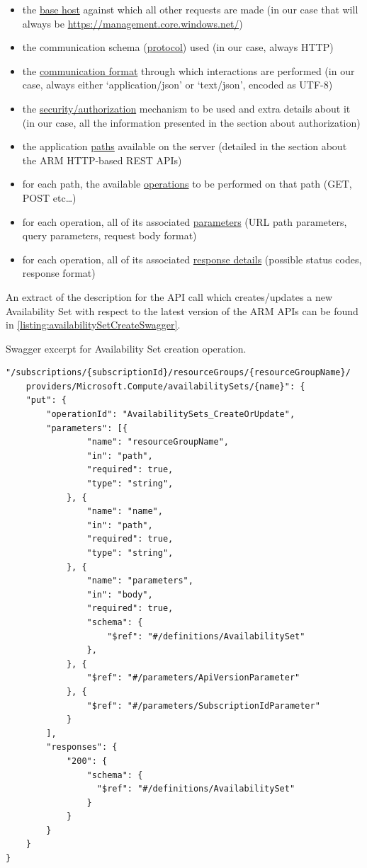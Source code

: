 \documentclass[11pt]{report}
\begin{document}
\begin{itemize}
    \item{} the \ul{base host} against which all other requests are made (in our
        case that will always be \url{https://management.core.windows.net/})
    \item{} the communication schema (\ul{protocol}) used (in our case,
        always HTTP)
    \item{} the \ul{communication format} through which interactions are
        performed (in our case, always either `application/json' or
        `text/json', encoded as UTF-8)
    \item{} the \ul{security/authorization} mechanism to be used and extra details
        about it (in our case, all the information presented in the section
        about authorization)
    \item{} the application \ul{paths} available on the server (detailed in the
        section about the ARM HTTP-based REST APIs)
    \item{} for each path, the available \ul{operations} to be performed on
        that path (GET, POST etc\ldots)
    \item{} for each operation, all of its associated \ul{parameters} (URL path
        parameters, query parameters, request body format)
    \item{} for each operation, all of its associated \ul{response details}
        (possible status codes, response format)
\end{itemize}

An extract of the description for the API call which creates/updates a new
Availability Set with respect to the latest version of the ARM APIs can be
found in \autoref{listing:availabilitySetCreateSwagger}.

\begin{listing}[H]
\caption{Swagger excerpt for Availability Set creation operation.}
\label{listing:availabilitySetCreateSwagger}
\begin{verbatim}
"/subscriptions/{subscriptionId}/resourceGroups/{resourceGroupName}/
    providers/Microsoft.Compute/availabilitySets/{name}": {
    "put": {
        "operationId": "AvailabilitySets_CreateOrUpdate",
        "parameters": [{
                "name": "resourceGroupName",
                "in": "path",
                "required": true,
                "type": "string",
            }, {
                "name": "name",
                "in": "path",
                "required": true,
                "type": "string",
            }, {
                "name": "parameters",
                "in": "body",
                "required": true,
                "schema": {
                    "$ref": "#/definitions/AvailabilitySet"
                },
            }, {
                "$ref": "#/parameters/ApiVersionParameter"
            }, {
                "$ref": "#/parameters/SubscriptionIdParameter"
            }
        ],
        "responses": {
            "200": {
                "schema": {
                  "$ref": "#/definitions/AvailabilitySet"
                }
            }
        }
    }
}
\end{verbatim}
\end{listing}
\end{document}

